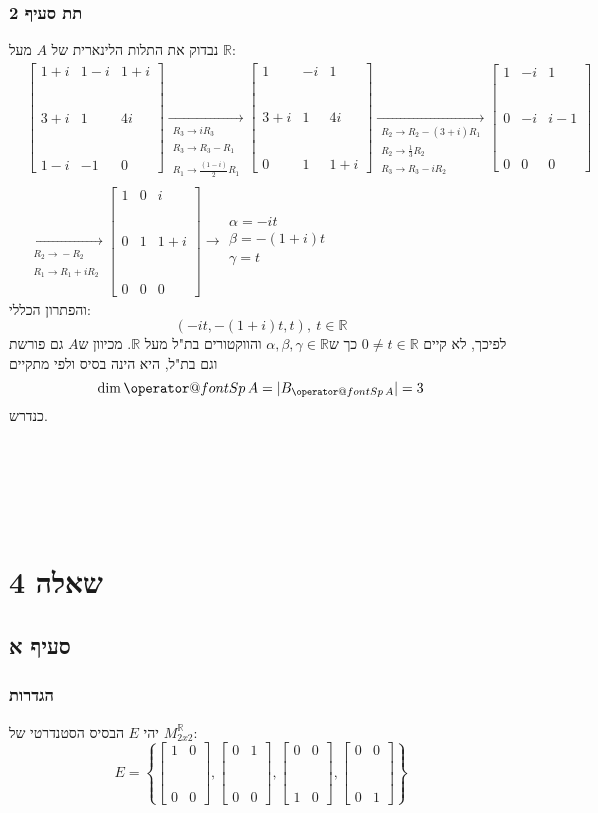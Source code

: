 \documentclass[11pt, oneside]{article}
\makeatletter
\newcommand{\qed}{\R{$\blacksquare$}}
\newcommand{\br}{\\\\\\\\\\\\}
\newcommand{\opr}[1]{\xrightarrow[\text{#1}]{}}
\newcommand{\oprm}[1]{\underset{\substack{#1}}{\longrightarrow}}
\newcommand{\mR}{\mathbb{R}}
\newcommand{\h}[3]{\R{הגדרה #3#2.#1}}
\newcommand{\Sp}[1]{\mathop{\operator@font Sp}#1}
\newcommand{\tot}[4]{\begin{bmatrix}#1 & #2\br#3 & #4\end{bmatrix}}
\makeatother
\begin{document}
\subsubsection{תת סעיף 2}
נבדוק את התלות הלינארית של $A$ מעל $\mR$:
\begin{align*}
& \begin{bmatrix}
1 + i & 1 - i & 1 + i\br
3 + i & 1 & 4i\br
1 - i & -1 & 0
\end{bmatrix}
\oprm{%
R_3 \opr{} iR_3\\
R_3 \opr{} R_3 - R_1\\
R_1 \opr{} \frac{(1 - i)}{2}R_1
}
\begin{bmatrix}
1 & -i & 1\br
3 + i & 1 & 4i\br
0 & 1 & 1 + i
\end{bmatrix}
\oprm{%
R_2 \opr{} R_2 - (3 + i)R_1\\
R_2 \opr{} \frac{1}{3}R_2\\
R_3 \opr{} R_3 - iR_2
}
\begin{bmatrix}
1 & -i & 1\br
0 & -i & i - 1\br
0 & 0 & 0
\end{bmatrix}\\
& \oprm{%
R_2 \opr{} -R_2\\
R_1 \opr{} R_1 + iR_2
}
\begin{bmatrix}
1 & 0 & i\br
0 & 1 & 1 + i\br
0 & 0 & 0
\end{bmatrix}
\opr{}
\begin{matrix}
\alpha = -it\\
\beta = -(1 + i)t\\
\gamma = t
\end{matrix}
\end{align*}
והפתרון הכללי:
$$(-it, -(1 + i)t, t),\ t \in \mR$$
לפיכך, לא קיים $0 \neq t \in \mR$ כך ש$\alpha, \beta, \gamma \in \mR$ והווקטורים בת"ל מעל $\mR$. מכיוון ש$A$ גם פורשת וגם בת"ל, היא הינה בסיס ולפי \h{8}{3}{3.} מתקיים
$$\dim{\Sp{A}} = |B_{\Sp{A}}| = 3$$
כנדרש.
\br\qed
\clearpage

\section{שאלה 4}
\subsection{סעיף א}
\setcounter{subsubsection}{-1}
\subsubsection{הגדרות}
יהי $E$ הבסיס הסטנדרטי של $M^\mR_{2x2}$:
$$E = \left\{
\tot{1}{0}{0}{0},
\tot{0}{1}{0}{0},
\tot{0}{0}{1}{0},
\tot{0}{0}{0}{1}
\right\}$$
\end{document}
